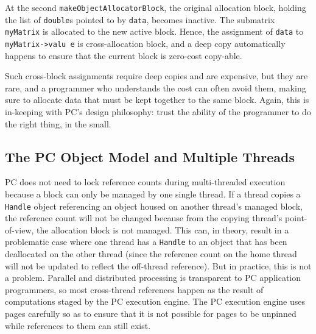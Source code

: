 At the second \texttt{makeObjectAllocatorBlock}, the original allocation block, holding the list of \texttt{double}s pointed to by \texttt{data}, becomes
inactive.  The submatrix \texttt{myMatrix} is allocated to the new active block.  
Hence, the assignment of \texttt{data} to \texttt{myMatrix->valu e} is cross-allocation block, and a deep copy automatically happens to ensure that
the current block is zero-cost copy-able.  

Such cross-block assignments require deep copies and are
expensive, but they are rare, and a programmer who understands the cost can often avoid them, making sure to allocate
data that must be kept together to the same block.
Again, this is in-keeping with PC's design philosophy: trust the ability of the programmer to do the right thing, in the small.

\subsection{The PC Object Model and Multiple Threads}

PC does not need to lock reference counts during multi-threaded execution
because 
a block can only be managed by one single thread.  
If a thread copies a \texttt{Handle} object referencing an object housed on another thread's managed block, 
the reference count will not be changed because from the copying thread's point-of-view, the allocation block is not managed.
This can, in theory, result in a problematic case where one thread has a \texttt{Handle} to an object that has been deallocated on the other thread (since
the reference count on the home thread will not be updated to reflect
the off-thread reference).  But in practice, this is not a
problem.  Parallel and distributed processing is transparent to PC application
programmers, so most cross-thread references happen as the result of computations staged by the 
PC execution engine.  The PC execution engine uses pages carefully so as to ensure that 
it is not possible for pages to be unpinned while references to them can still exist.

